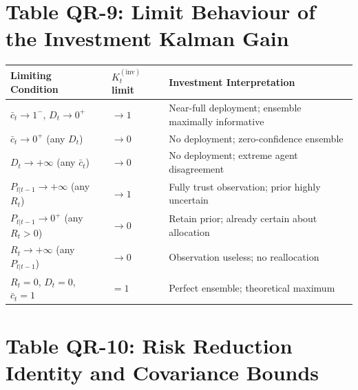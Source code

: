 \documentclass[12pt,openany]{book}
\numberwithin{equation}{chapter}
\theoremstyle{plain}
\theoremstyle{definition}
\theoremstyle{remark}
\renewcommand{\arraystretch}{1.2}
\begin{document}
\section*{Table QR-9: Limit Behaviour of the Investment Kalman Gain}

\begin{center}
\small
\renewcommand{\arraystretch}{1.40}
\begin{tabularx}{\linewidth}{@{}
  >{\raggedright\arraybackslash}p{3.8cm}
  >{\centering\arraybackslash}p{2.2cm}
  >{\raggedright\arraybackslash}X
@{}}
\toprule
Limiting Condition & $K_t^{(\mathrm{inv})}$ limit & Investment Interpretation \\
\midrule
$\bar{c}_t\to 1^-$, $D_t\to 0^+$ & $\to 1$ & Near-full deployment; ensemble maximally informative \\
$\bar{c}_t\to 0^+$ (any $D_t$) & $\to 0$ & No deployment; zero-confidence ensemble \\
$D_t\to +\infty$ (any $\bar{c}_t$) & $\to 0$ & No deployment; extreme agent disagreement \\
$P_{t|t-1}\to +\infty$ (any $R_t$) & $\to 1$ & Fully trust observation; prior highly uncertain \\
$P_{t|t-1}\to 0^+$ (any $R_t>0$) & $\to 0$ & Retain prior; already certain about allocation \\
$R_t\to +\infty$ (any $P_{t|t-1}$) & $\to 0$ & Observation useless; no reallocation \\
$R_t=0$, $D_t=0$, $\bar{c}_t=1$ & $= 1$ & Perfect ensemble; theoretical maximum \\
\bottomrule
\end{tabularx}
\end{center}

\section*{Table QR-10: Risk Reduction Identity and Covariance Bounds}
\end{document}
